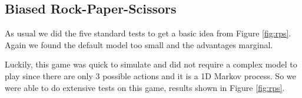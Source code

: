 \documentclass{article}
\let\Oldsubsection\subsection
\renewcommand{\subsection}{\FloatBarrier\Oldsubsection}
\begin{document}
\begin{flushleft}
\def\cmcurves{
\one{../logs/sp4-cheesemaze.csv} \addlegendentry{D=64 H=2}
\one{../logs/sp6-cheesemaze.csv} \addlegendentry{D=32 H=2}
\one{../logs/sp9-cheesemaze.csv} \addlegendentry{D=64 H=1}
\one{../logs/sp7-cheesemaze.csv} \addlegendentry{D=32 H=1}
\one{../logs/spD-cm.csv} \addlegendentry{D=64 H=3}
\one{../logs/spC-cm.csv} \addlegendentry{D=32 H=3}
\one{../logs/sp2-cheesemaze.csv} \addlegendentry{D=32 H=4}
\one{../logs/sp5-cheesemaze.csv} \addlegendentry{D=64 H=4}
\one{../logs/spA-cm.csv} \addlegendentry{D=16 H=2}
\one{../logs/sp1-p-cheesemaze.csv} \addlegendentry{D=16 H=4 R}
\one{../logs/spB-cm.csv} \addlegendentry{D=16 H=3}
\one{../logs/sp1-cheesemaze.csv} \addlegendentry{D=16 H=4}
\one{../logs/sp8-cheesemaze.csv} \addlegendentry{D=32 H=0}
}

\begin{figure}

\end{figure}

\newpage
\subsection{Biased Rock-Paper-Scissors}

As usual we did the five standard tests to get a basic idea from Figure
\ref{fig:rps}.
Again we found the default model too small and the advantages marginal.

Luckily, this game was quick to simulate and did not require a complex model
to play since there are only 3 possible actions and it is a 1D Markov 
process. So we were able to do extensive tests on this game, results shown 
in Figure \ref{fig:rps}.


\end{flushleft}
\end{document}
